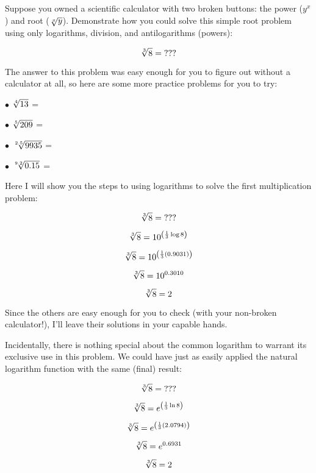 

Suppose you owned a scientific calculator with two broken buttons: the power ($y^x$) and root ($\root x \of y$).  Demonstrate how you could solve this simple root problem using only logarithms, division, and antilogarithms (powers):

$$\root 3 \of 8 = \hbox{???}$$

The answer to this problem was easy enough for you to figure out without a calculator at all, so here are some more practice problems for you to try:

\medskip
\goodbreak
\item{$\bullet$} $\root 4 \of {13}$ = 
\vskip 5pt
\item{$\bullet$} $\root 5 \of {209}$ = 
\vskip 5pt
\item{$\bullet$} $\root 2.5 \of {9935}$ = 
\vskip 5pt
\item{$\bullet$} $\root 9.2 \of {0.15}$ = 
\medskip







Here I will show you the steps to using logarithms to solve the first multiplication problem:

$$\root 3 \of 8 = \hbox{???}$$

$$\root 3 \of 8 = 10^{\left( {1 \over 3} \log 8 \right)}$$

$$\root 3 \of 8 = 10^{\left( {1 \over 3} (0.9031) \right)}$$

$$\root 3 \of 8 = 10^{0.3010}$$

$$\root 3 \of 8 = 2$$

Since the others are easy enough for you to check (with your non-broken calculator!), I'll leave their solutions in your capable hands.







Incidentally, there is nothing special about the common logarithm to warrant its exclusive use in this problem.  We could have just as easily applied the natural logarithm function with the same (final) result:

$$\root 3 \of 8 = \hbox{???}$$

$$\root 3 \of 8 = e^{\left( {1 \over 3} \ln 8 \right)}$$

$$\root 3 \of 8 = e^{\left( {1 \over 3} (2.0794) \right)}$$

$$\root 3 \of 8 = e^{0.6931}$$

$$\root 3 \of 8 = 2$$





